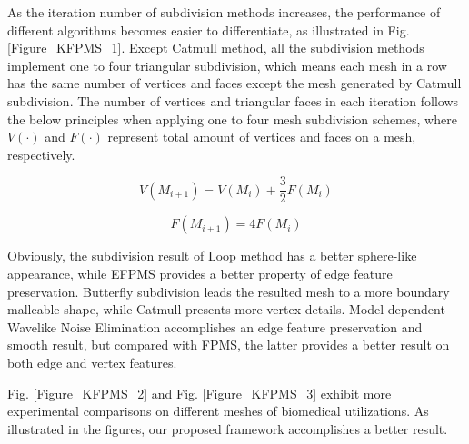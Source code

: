 \documentclass[10pt, conference, compsocconf]{IEEEtran}
\begin{document}
As the iteration number of subdivision methods increases, the performance of different algorithms becomes easier to differentiate, as illustrated in Fig. \ref{Figure_KFPMS_1}. Except Catmull method, all the subdivision methods implement one to four triangular subdivision, which means each mesh in a row has the same number of vertices and faces except the mesh generated by Catmull subdivision. The number of vertices and triangular faces in each iteration follows the below principles when applying one to four mesh subdivision schemes, where $V(\cdot)$ and $F(\cdot)$ represent total amount of vertices and faces on a mesh, respectively.

\begin{equation}\label{Equation_V}
  V(M_{i+1})=V(M_i)+\frac{3}{2}F(M_i)
\end{equation}

\begin{equation}\label{Equation_F}
  F(M_{i+1})=4F(M_i)
\end{equation}

Obviously, the subdivision result of Loop method has a better sphere-like appearance, while EFPMS provides a better property of edge feature preservation. Butterfly subdivision leads the resulted mesh to a more boundary malleable shape, while Catmull presents more vertex details. Model-dependent Wavelike Noise Elimination accomplishes an edge feature preservation and smooth result, but compared with FPMS, the latter provides a better result on both edge and vertex features.

Fig. \ref{Figure_KFPMS_2} and Fig. \ref{Figure_KFPMS_3} exhibit more experimental comparisons on different meshes of biomedical utilizations. As illustrated in the figures, our proposed framework accomplishes a better result.



%
%
\end{document}
